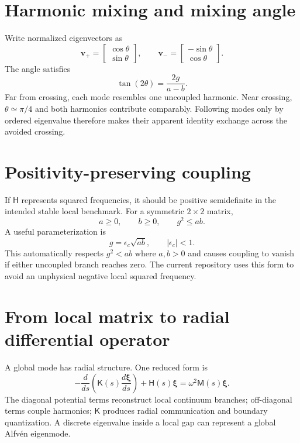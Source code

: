 \documentclass[11pt]{article}
\begin{document}
\section{Harmonic mixing and mixing angle}

Write normalized eigenvectors as
\begin{equation}
\mathbf v_+=
\begin{bmatrix}\cos\theta\\ \sin\theta\end{bmatrix},
\qquad
\mathbf v_-=
\begin{bmatrix}-\sin\theta\\ \cos\theta\end{bmatrix}.
\end{equation}
The angle satisfies
\begin{equation}
\tan(2\theta)=\frac{2g}{a-b}.
\end{equation}
Far from crossing, each mode resembles one uncoupled harmonic. Near crossing, $\theta\simeq\pi/4$ and both harmonics contribute comparably. Following modes only by ordered eigenvalue therefore makes their apparent identity exchange across the avoided crossing.


\section{Positivity-preserving coupling}

If $\mathsf H$ represents squared frequencies, it should be positive semidefinite in the intended stable local benchmark. For a symmetric $2\times2$ matrix,
\begin{equation}
a\ge0,\qquad b\ge0,\qquad g^2\le ab.
\end{equation}
A useful parameterization is
\begin{equation}
\boxed{g=\epsilon_c\sqrt{ab}},\qquad |\epsilon_c|<1.
\end{equation}
This automatically respects $g^2<ab$ where $a,b>0$ and causes coupling to vanish if either uncoupled branch reaches zero. The current repository uses this form to avoid an unphysical negative local squared frequency.


\section{From local matrix to radial differential operator}

A global mode has radial structure. One reduced form is
\begin{equation}
-\frac{d}{ds}\left(\mathsf K(s)\frac{d\boldsymbol\xi}{ds}\right)
+\mathsf H(s)\boldsymbol\xi
=\omega^2\mathsf M(s)\boldsymbol\xi.
\end{equation}
The diagonal potential terms reconstruct local continuum branches; off-diagonal terms couple harmonics; $\mathsf K$ produces radial communication and boundary quantization. A discrete eigenvalue inside a local gap can represent a global Alfvén eigenmode.
\end{document}
